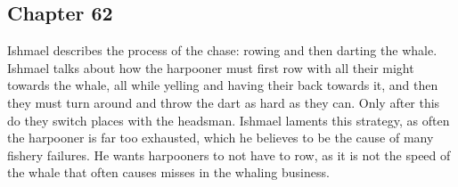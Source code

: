 \subsection{Chapter 62}

Ishmael describes the process of the chase: rowing and then darting the whale.
Ishmael talks about how the harpooner must first row with all their might
towards the whale, all while yelling and having their back towards it, and then
they must turn around and throw the dart as hard as they can. Only after this
do they switch places with the headsman. Ishmael laments this strategy, as
often the harpooner is far too exhausted, which he believes to be the cause of
many fishery failures. He wants harpooners to not have to row, as it is not the
speed of the whale that often causes misses in the whaling business.

